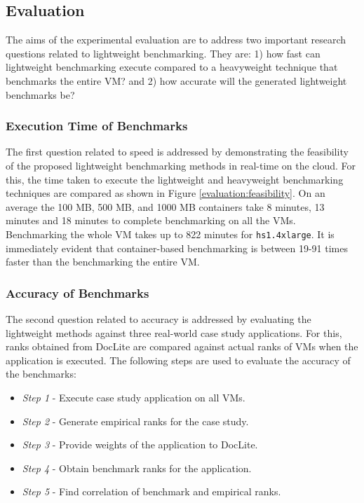 \subsection{Evaluation}
\label{studies:evaluation}

The aims of the experimental evaluation are to address two important research questions related to lightweight benchmarking. They are: 1) how fast can lightweight benchmarking execute compared to a heavyweight technique that benchmarks the entire VM? and 2) how accurate will the generated lightweight benchmarks be?

\subsubsection{Execution Time of Benchmarks}
\label{eval:time}
The first question related to speed is addressed by demonstrating the feasibility of the proposed lightweight benchmarking methods in real-time on the cloud. For this, the time taken to execute the lightweight and heavyweight benchmarking techniques are compared as shown in Figure \ref{evaluation:feasibility}. On an average the 100 MB, 500 MB, and 1000 MB containers take 8 minutes, 13 minutes and 18 minutes to complete benchmarking on all the VMs. Benchmarking the whole VM takes up to 822 minutes for \texttt{hs1.4xlarge}.  
It is immediately evident that container-based benchmarking is between 19-91 times faster than the benchmarking the entire VM.  

\subsubsection{Accuracy of Benchmarks}
\label{evaluation:empiricalanalysis}
The second question related to accuracy is addressed by evaluating the lightweight methods against three real-world case study applications. For this, ranks obtained from DocLite are compared against actual ranks of VMs when the application is executed. The following steps are used to evaluate the accuracy of the benchmarks:
\begin{itemize}
\item \textit{Step 1} - Execute case study application on all VMs.
\item \textit{Step 2} - Generate empirical ranks for the case study.
\item \textit{Step 3} - Provide weights of the application to DocLite.
\item \textit{Step 4} - Obtain benchmark ranks for the application.
\item \textit{Step 5} - Find correlation of benchmark and empirical ranks.
\end{itemize}

